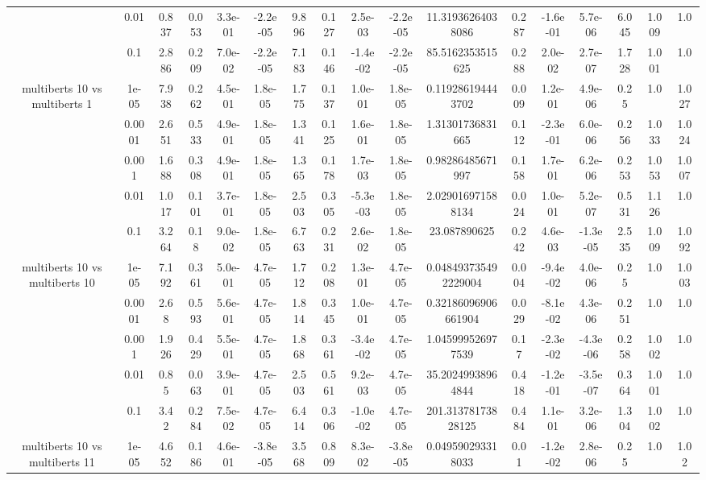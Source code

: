 \begin{tabular}{|c|c|c|c|c|c|c|c|c|c|c|c|c|c|c|c|c|}
 & 0.01 & 0.837 & 0.053 & 3.3e-01 & -2.2e-05 & 9.896 & 0.127 & 2.5e-03 & -2.2e-05 & 11.31936264038086 & 0.287 & -1.6e-01 & 5.7e-06 & 6.045 & 1.009 & 1.0 \\
 & 0.1 & 2.886 & 0.209 & 7.0e-02 & -2.2e-05 & 7.183 & 0.146 & -1.4e-02 & -2.2e-05 & 85.5162353515625 & 0.288 & 2.0e-02 & 2.7e-07 & 1.728 & 1.001 & 1.0 \\
\hline
\multirow{5}{*}{multiberts 10 vs multiberts 1} & 1e-05 & 7.938 & 0.262 & 4.5e-01 & 1.8e-05 & 1.775 & 0.137 & 1.0e-01 & 1.8e-05 & 0.119286194443702 & 0.009 & 1.2e-01 & 4.9e-06 & 0.25 & 1.0 & 1.027 \\
 & 0.0001 & 2.651 & 0.533 & 4.9e-01 & 1.8e-05 & 1.341 & 0.125 & 1.6e-01 & 1.8e-05 & 1.31301736831665 & 0.112 & -2.3e-01 & 6.0e-06 & 0.256 & 1.033 & 1.024 \\
 & 0.001 & 1.688 & 0.308 & 4.9e-01 & 1.8e-05 & 1.365 & 0.178 & 1.7e-03 & 1.8e-05 & 0.98286485671997 & 0.158 & 1.7e-01 & 6.2e-06 & 0.253 & 1.053 & 1.007 \\
 & 0.01 & 1.017 & 0.101 & 3.7e-01 & 1.8e-05 & 2.503 & 0.305 & -5.3e-03 & 1.8e-05 & 2.029016971588134 & 0.024 & 1.0e-01 & 5.2e-07 & 0.531 & 1.126 & 1.0 \\
 & 0.1 & 3.264 & 0.18 & 9.0e-02 & 1.8e-05 & 6.763 & 0.231 & 2.6e-02 & 1.8e-05 & 23.087890625 & 0.242 & 4.6e-03 & -1.3e-05 & 2.535 & 1.009 & 1.092 \\
\hline
\multirow{5}{*}{multiberts 10 vs multiberts 10} & 1e-05 & 7.192 & 0.361 & 5.0e-01 & 4.7e-05 & 1.712 & 0.208 & 1.3e-01 & 4.7e-05 & 0.048493735492229004 & 0.004 & -9.4e-02 & 4.0e-06 & 0.25 & 1.0 & 1.003 \\
 & 0.0001 & 2.68 & 0.593 & 5.6e-01 & 4.7e-05 & 1.814 & 0.345 & 1.0e-01 & 4.7e-05 & 0.32186096906661904 & 0.029 & -8.1e-02 & 4.3e-06 & 0.251 & 1.0 & 1.0 \\
 & 0.001 & 1.926 & 0.429 & 5.5e-01 & 4.7e-05 & 1.868 & 0.361 & -3.4e-02 & 4.7e-05 & 1.045999526977539 & 0.17 & -2.3e-02 & -4.3e-06 & 0.258 & 1.002 & 1.0 \\
 & 0.01 & 0.85 & 0.063 & 3.9e-01 & 4.7e-05 & 2.503 & 0.561 & 9.2e-03 & 4.7e-05 & 35.20249938964844 & 0.418 & -1.2e-01 & -3.5e-07 & 0.364 & 1.001 & 1.0 \\
 & 0.1 & 3.42 & 0.284 & 7.5e-02 & 4.7e-05 & 6.414 & 0.306 & -1.0e-02 & 4.7e-05 & 201.31378173828125 & 0.484 & 1.1e-01 & 3.2e-06 & 1.304 & 1.002 & 1.0 \\
\hline
\multirow{5}{*}{multiberts 10 vs multiberts 11} & 1e-05 & 4.652 & 0.186 & 4.6e-01 & -3.8e-05 & 3.568 & 0.809 & 8.3e-02 & -3.8e-05 & 0.049590293318033 & 0.01 & -1.2e-02 & 2.8e-06 & 0.25 & 1.0 & 1.02 \\

\end{tabular}

